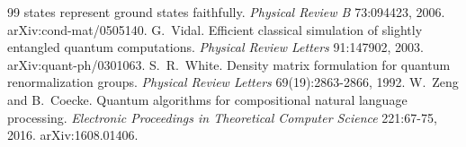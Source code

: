 \documentclass[10pt]{article}
\begin{document}
\begin{thebibliography}{99}
states represent ground states faithfully. \emph{Physical Review B} 73:094423, 2006.
arXiv:cond-mat/0505140.
 G.~Vidal. Efficient classical simulation of slightly entangled
quantum computations. \emph{Physical Review Letters} 91:147902, 2003. arXiv:quant-ph/0301063.
 S.~R.~White. Density matrix formulation for quantum renormalization
groups. \emph{Physical Review Letters} 69(19):2863-2866, 1992.
 W.~Zeng and B.~Coecke. Quantum algorithms for compositional
natural language processing. \emph{Electronic Proceedings in Theoretical Computer Science}
221:67-75, 2016. arXiv:1608.01406.
\end{thebibliography}

\appendix




\end{document}
